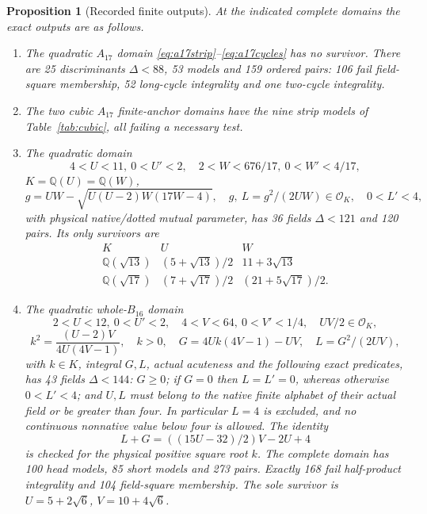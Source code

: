\documentclass[11pt]{article}
\newtheorem{proposition}[theorem]{Proposition}
\newcommand{\QQ}{\mathbb Q}
\newcommand{\OK}{\mathcal O_K}
\begin{document}
\begin{proposition}[Recorded finite outputs]\label{prop:pair-output}
At the indicated complete domains the exact outputs are as follows.
\begin{enumerate}
\item The quadratic $A_{17}$ domain
\eqref{eq:a17strip}--\eqref{eq:a17cycles} has no survivor.
There are 25 discriminants $\Delta<88$, 53 models and 159 ordered
pairs: 106 fail field-square membership, 52 long-cycle integrality
and one two-cycle integrality.
\item The two cubic $A_{17}$ finite-anchor domains have the nine
strip models of Table~\ref{tab:cubic}, all failing a necessary test.
\item The quadratic domain
\[
 4<U<11,\ 0<U'<2,\quad2<W<676/17,\ 0<W'<4/17,
\]
$K=\QQ(U)=\QQ(W)$,
\[
 g=UW-\sqrt{U(U-2)W(17W-4)},\quad
 g,\ L=g^2/(2UW)\in\OK,\quad0<L'<4,
\]
with physical native/dotted mutual parameter, has 36 fields
$\Delta<121$ and 120 pairs. Its only survivors are
\[
 \begin{array}{c|cc}
 K&U&W\\\hline
 \QQ(\sqrt{13})&(5+\sqrt{13})/2&11+3\sqrt{13}\\
 \QQ(\sqrt{17})&(7+\sqrt{17})/2&(21+5\sqrt{17})/2 .
 \end{array}
\]
\item The quadratic whole-$B_{16}$ domain
\[
 2<U<12,\ 0<U'<2,\quad4<V<64,\ 0<V'<1/4,\quad UV/2\in\OK,
\]
\[
 k^2=\frac{(U-2)V}{4U(4V-1)},\quad k>0,\quad
 G=4Uk(4V-1)-UV,\quad L=G^2/(2UV),
\]
with $k\in K$, integral $G,L$, actual acuteness and
the following exact predicates, has 43 fields $\Delta<144$:
$G\ge0$; if $G=0$ then $L=L'=0$, whereas otherwise
$0<L'<4$; and $U,L$ must belong to the native finite alphabet
of their actual field or be greater than four. In particular $L=4$
is excluded, and no continuous nonnative value below four is allowed.
The identity
\[
 L+G=((15U-32)/2)V-2U+4
\]
is checked for the physical positive square root $k$.
The complete domain has
100 head models, 85 short models and 273 pairs.
Exactly 168 fail half-product integrality and 104 field-square
membership. The sole survivor is $U=5+2\sqrt6$, $V=10+4\sqrt6$.
\end{enumerate}
\end{proposition}
\end{document}
